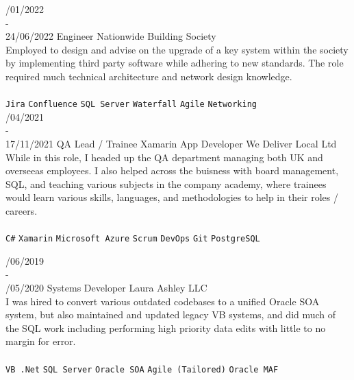 \documentclass[12pt]{developercv} %
\begin{document}
\begin{entrylist}


\entry
	{/01/2022\\-\\24/06/2022}
	{Engineer}
	{Nationwide Building Society}
	{
		{
\\
Employed to design and advise on the upgrade of a key system within the society by implementing third party software while adhering to new standards. The role required much technical architecture and network design knowledge.
\\\\
		}
	\texttt{Jira}\slashsep
	\texttt{Confluence}\slashsep
	\texttt{SQL Server}\slashsep
	\texttt{Waterfall}\slashsep
	\texttt{Agile}\slashsep
	\texttt{Networking}
	}
\\

\entry
	{/04/2021\\-\\17/11/2021}
	{QA Lead / \small Trainee Xamarin App Developer}
	{We Deliver Local Ltd}
	{
		{
\\
While in this role, I headed up the QA department managing both UK and overseeas employees. I also helped across the buisness with board management, SQL, and teaching various subjects in the company academy, where trainees would learn various skills, languages, and methodologies to help in their roles / careers.
\\\\
		}
	\texttt{C\#}\slashsep
	\texttt{Xamarin}\slashsep
	\texttt{Microsoft Azure}\slashsep
	\texttt{Scrum}\slashsep
	\texttt{DevOps}\slashsep
	\texttt{Git}\slashsep
	\texttt{PostgreSQL}
	}


\entry
	{/06/2019 \\-\\ /05/2020}
	{Systems Developer}
	{Laura Ashley LLC}
	{
		{
\\
I was hired to convert various outdated codebases to a unified Oracle SOA system, but also maintained and updated legacy VB systems, and did much of the SQL work including performing high priority data edits with little to no margin for error.
\\\\
		}
		\texttt{VB .Net}\slashsep
		\texttt{SQL Server}\slashsep
		\texttt{Oracle SOA}\slashsep
		\texttt{Agile (Tailored)}\slashsep
		\texttt{Oracle MAF}
	}


\end{entrylist}
\end{document}

